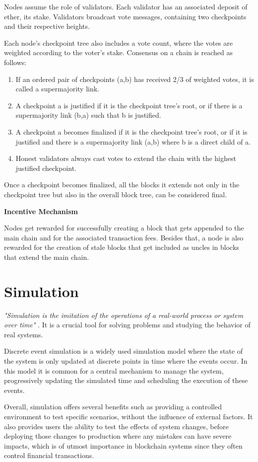Nodes assume the role of validators. Each validator has an associated deposit of ether, its stake. Validators broadcast vote messages, containing two checkpoints and their respective heights.

Each node’s checkpoint tree also includes a vote count, where the votes are weighted according to the voter’s stake. Consensus on a chain is reached as follows:

\begin{enumerate}
  \item If an ordered pair of checkpoints (a,b) has received 2/3 of weighted votes, it is called a supermajority link.
  \item A checkpoint a is justified if it is the checkpoint tree’s root, or if there is a supermajority link (b,a) such that b is justified.
  \item A checkpoint a becomes finalized if it is the checkpoint tree’s root, or if it is justified and there is a supermajority link (a,b) where b is a direct child of a.
  \item Honest validators always cast votes to extend the chain with the highest justified checkpoint.
\end{enumerate}

Once a checkpoint becomes finalized, all the blocks it extends not only in the checkpoint tree but also in the overall block tree, can be considered final.

\vspace{0.25cm}

\textbf{Incentive Mechanism}

Nodes get rewarded for successfully creating a block that gets appended to the main chain and for the associated transaction fees. Besides that, a node is also rewarded for the creation of stale blocks that get included as uncles in blocks that extend the main chain.




\section{Simulation}

\textit{"Simulation is the imitation of the operations of a real-world process or system over time"} \cite{intro_simulation}. It is a crucial tool for solving problems and studying the behavior of real systems.

Discrete event simulation is a widely used simulation model where the state of the system is only updated at discrete points in time where the events occur. In this model it is common for a central mechanism to manage the system, progressively updating the simulated time and scheduling the execution of these events.

Overall, simulation offers several benefits \cite{intro_simulation} such as providing a controlled environment to test specific scenarios, without the influence of external factors. It also provides users the ability to test the effects of system changes, before deploying those changes to production where any mistakes can have severe impacts, which is of utmost importance in blockchain systems since they often control financial transactions.